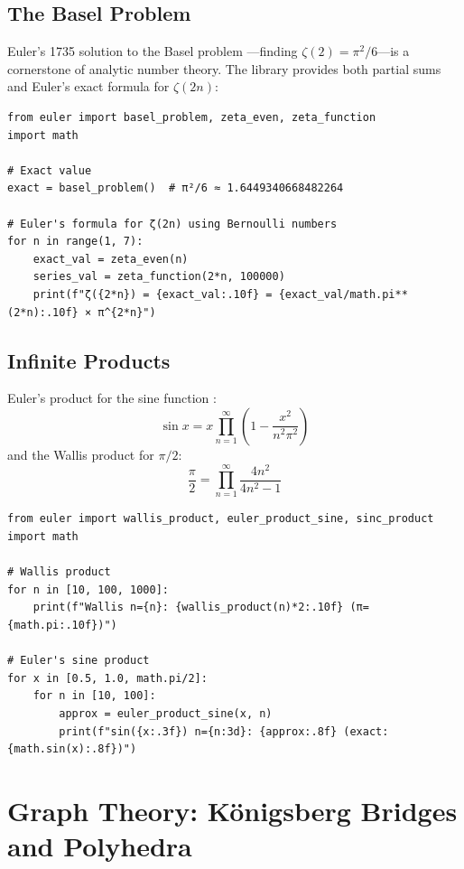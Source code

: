 \documentclass[11pt,a4paper]{article}
\theoremstyle{definition}
\begin{document}
\subsection{The Basel Problem}
Euler's 1735 solution to the Basel problem \cite{euler1735}---finding $\zeta(2) = \pi^2/6$---is a cornerstone of analytic number theory. The library provides both partial sums and Euler's exact formula for $\zeta(2n)$:

\begin{lstlisting}[caption={Basel problem and zeta values}, label=lst:basel]
from euler import basel_problem, zeta_even, zeta_function
import math

# Exact value
exact = basel_problem()  # π²/6 ≈ 1.6449340668482264

# Euler's formula for ζ(2n) using Bernoulli numbers
for n in range(1, 7):
    exact_val = zeta_even(n)
    series_val = zeta_function(2*n, 100000)
    print(f"ζ({2*n}) = {exact_val:.10f} = {exact_val/math.pi**(2*n):.10f} × π^{2*n}")
\end{lstlisting}

\subsection{Infinite Products}
Euler's product for the sine function \cite{euler1748}:
\[
\sin x = x \prod_{n=1}^\infty \left(1 - \frac{x^2}{n^2\pi^2}\right)
\]
and the Wallis product \cite{wallis1655} for $\pi/2$:
\[
\frac{\pi}{2} = \prod_{n=1}^\infty \frac{4n^2}{4n^2-1}
\]

\begin{lstlisting}[caption={Infinite products}, label=lst:infinite_products]
from euler import wallis_product, euler_product_sine, sinc_product
import math

# Wallis product
for n in [10, 100, 1000]:
    print(f"Wallis n={n}: {wallis_product(n)*2:.10f} (π={math.pi:.10f})")

# Euler's sine product
for x in [0.5, 1.0, math.pi/2]:
    for n in [10, 100]:
        approx = euler_product_sine(x, n)
        print(f"sin({x:.3f}) n={n:3d}: {approx:.8f} (exact: {math.sin(x):.8f})")
\end{lstlisting}

\section{Graph Theory: K\"onigsberg Bridges and Polyhedra}
\label{sec:graph_theory}
\end{document}
